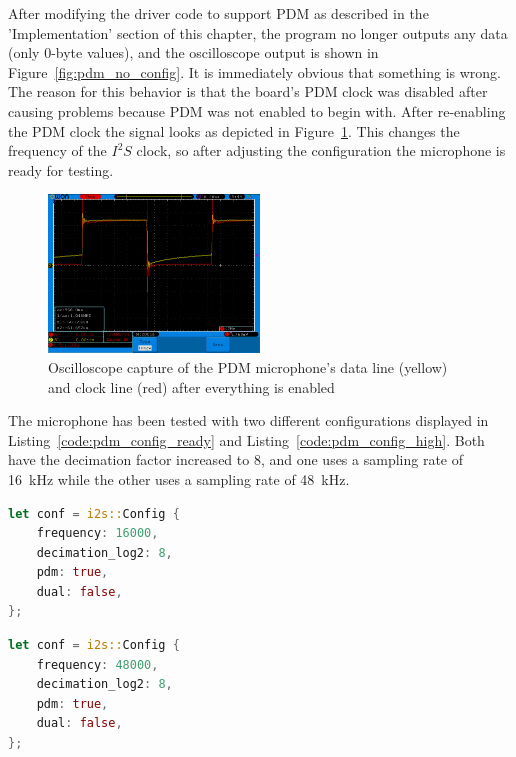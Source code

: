 After modifying the driver code to support PDM as described in the 'Implementation' section of this chapter,
the program no longer outputs any data (only 0-byte values), and the oscilloscope output is shown in Figure~\ref{fig:pdm_no_config}.
It is immediately obvious that something is wrong.
The reason for this behavior is that the board's PDM clock was disabled after causing problems because PDM was not enabled to begin with.
After re-enabling the PDM clock the signal looks as depicted in Figure~\ref{fig:pdm_working}.
This changes the frequency of the $I^2S$ clock, so after adjusting the configuration the microphone is ready for testing.

\begin{figure}[H]
    \begin{center}
        \includegraphics[width=0.5\textwidth]{figures/pdm_working.png}
    \end{center}
    \caption[Oscilloscope capture of the PDM microphone's data line (yellow) and clock line (red) after everything is enabled]
    {Oscilloscope capture of the PDM microphone's data line (yellow) and clock line (red) after everything is enabled}
    \label{fig:pdm_working}
\end{figure}

\begin{minipage}{\textwidth}
The microphone has been tested with two different configurations displayed in Listing~\ref{code:pdm_config_ready} and Listing~\ref{code:pdm_config_high}.
Both have the decimation factor increased to 8, and one uses a sampling rate of \SI{16}{\kilo\hertz} while the other uses a sampling rate of \SI{48}{\kilo\hertz}.

\begin{lstlisting}[style=colorEX,language=Rust,caption={Updated configuration of the PDM microphone with a 16kHz sampling rate},label={code:pdm_config_ready}]
let conf = i2s::Config {
    frequency: 16000,
    decimation_log2: 8,
    pdm: true,
    dual: false,
};
\end{lstlisting}

\begin{lstlisting}[style=colorEX,language=Rust,caption={Updated configuration of the PDM microphone with a 48kHz sampling rate},label={code:pdm_config_high}]
let conf = i2s::Config {
    frequency: 48000,
    decimation_log2: 8,
    pdm: true,
    dual: false,
};
\end{lstlisting}
\end{minipage}

